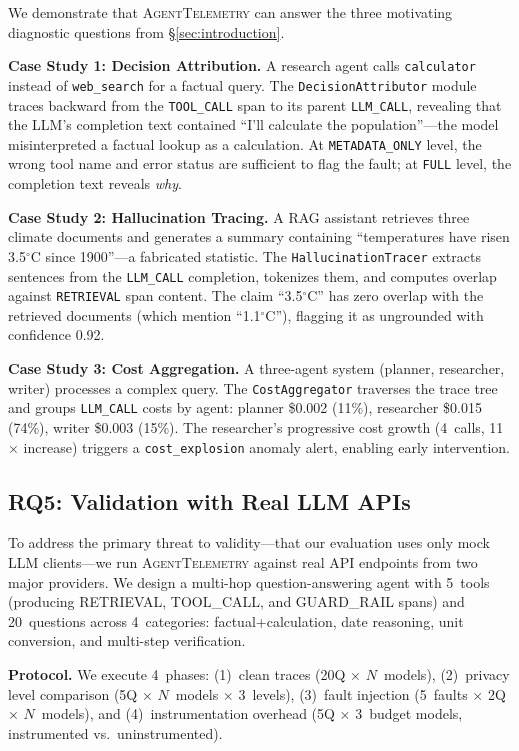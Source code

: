\documentclass[sigplan,10pt,screen]{acmart}
\begin{document}
We demonstrate that \textsc{AgentTelemetry} can answer the three
motivating diagnostic questions from \S\ref{sec:introduction}.

\textbf{Case Study 1: Decision Attribution.}  A research agent calls
\texttt{calculator} instead of \texttt{web\_search} for a factual
query.  The \texttt{DecisionAttributor} module traces backward from
the \texttt{TOOL\_CALL} span to its parent \texttt{LLM\_CALL},
revealing that the LLM's completion text contained ``I'll calculate
the population''---the model misinterpreted a factual lookup as a
calculation.  At \texttt{METADATA\_ONLY} level, the wrong tool name
and error status are sufficient to flag the fault; at \texttt{FULL}
level, the completion text reveals \emph{why}.

\textbf{Case Study 2: Hallucination Tracing.}  A RAG assistant
retrieves three climate documents and generates a summary containing
``temperatures have risen 3.5$^{\circ}$C since 1900''---a fabricated
statistic.  The \texttt{HallucinationTracer} extracts sentences from
the \texttt{LLM\_CALL} completion, tokenizes them, and computes
overlap against \texttt{RETRIEVAL} span content.  The claim ``3.5$^{\circ}$C''
has zero overlap with the retrieved documents (which mention
``1.1$^{\circ}$C''), flagging it as ungrounded with confidence 0.92.

\textbf{Case Study 3: Cost Aggregation.}  A three-agent system
(planner, researcher, writer) processes a complex query.  The
\texttt{CostAggregator} traverses the trace tree and groups
\texttt{LLM\_CALL} costs by agent: planner \$0.002 (11\%), researcher
\$0.015 (74\%), writer \$0.003 (15\%).  The researcher's progressive
cost growth (4~calls, 11$\times$ increase) triggers a
\texttt{cost\_explosion} anomaly alert, enabling early intervention.

\subsection{RQ5: Validation with Real LLM APIs}
\label{sec:rq5}

To address the primary threat to validity---that our evaluation uses only
mock LLM clients---we run \textsc{AgentTelemetry} against real API endpoints
from two major providers.  We design a multi-hop question-answering agent
with 5~tools (producing RETRIEVAL, TOOL\_CALL, and GUARD\_RAIL spans) and
20~questions across 4~categories: factual+calculation, date reasoning, unit
conversion, and multi-step verification.

\textbf{Protocol.}  We execute 4~phases: (1)~clean traces (20Q $\times$
$N$~models), (2)~privacy level comparison (5Q $\times$ $N$~models $\times$
3~levels), (3)~fault injection (5~faults $\times$ 2Q $\times$ $N$~models),
and (4)~instrumentation overhead (5Q $\times$ 3~budget models, instrumented
vs.\ uninstrumented).
\end{document}

